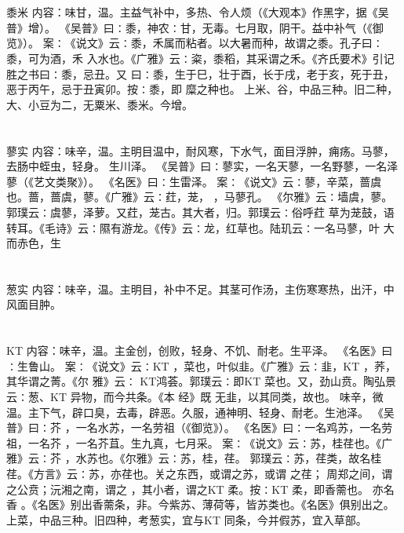 \documentclass[12pt,UTF8]{ctexbook}
\begin{document}
\chapter{}黍米
内容：味甘，温。主益气补中，多热、令人烦（《大观本》作黑字，据《吴普》增）。 
《吴普》曰∶黍，神农∶甘，无毒。七月取，阴干。益中补气（《御览》）。 
案∶《说文》云∶黍，禾属而粘者。以大暑而种，故谓之黍。孔子曰∶黍，可为酒，禾 
入水也。《广雅》云∶粢，黍稻，其采谓之禾。《齐氏要术》引记胜之书曰∶黍，忌丑。又 
曰∶黍，生于巳，壮于酉，长于戌，老于亥，死于丑，恶于丙午，忌于丑寅卯。按∶黍，即 
糜之种也。 
上米、谷，中品三种。旧二种，大、小豆为二，无粟米、黍米。今增。 


\chapter{}蓼实
内容：味辛，温。主明目温中，耐风寒，下水气，面目浮肿，痈疡。马蓼，去肠中蛭虫，轻身。 
生川泽。 
《吴普》曰∶蓼实，一名天蓼，一名野蓼，一名泽蓼（《艺文类聚》）。 
《名医》曰∶生雷泽。 
案∶《说文》云∶蓼，辛菜，蔷虞也。蔷，蔷虞，蓼。《广雅》云∶荭，茏， ，马蓼孔。 
《尔雅》云∶墙虞，蓼。郭璞云∶虞蓼，泽萝。又荭，茏古。其大者，归。郭璞云∶俗呼荭 
草为茏鼓，语转耳。《毛诗》云∶隰有游龙。《传》云∶龙，红草也。陆玑云∶一名马蓼，叶 
大而赤色，生 


\chapter{}葱实
内容：味辛，温。主明目，补中不足。其茎可作汤，主伤寒寒热，出汗，中风面目肿。 


\chapter{}KT
内容：味辛，温。主金创，创败，轻身、不饥、耐老。生平泽。 
《名医》曰∶生鲁山。 
案∶《说文》云∶KT ，菜也，叶似韭。《广雅》云∶韭，KT ，荞，其华谓之菁。《尔 
雅》云∶ 
KT鸿荟。郭璞云∶即KT 菜也。又，劲山贲。陶弘景云∶葱、KT 异物，而今共条。《本 
经》既 
无韭，以其同类，故也。 
味辛，微温。主下气，辟口臭，去毒，辟恶。久服，通神明、轻身、耐老。生池泽。 
《吴普》曰∶芥 ，一名水苏，一名劳祖（《御览》）。 
《名医》曰∶一名鸡苏，一名劳祖，一名芥 ，一名芥苴。生九真，七月采。 
案∶《说文》云∶苏，桂荏也。《广雅》云∶芥 ，水苏也。《尔雅》云∶苏，桂，荏。 
郭璞云∶苏，荏类，故名桂荏。《方言》云∶苏，亦荏也。关之东西，或谓之苏，或谓 
之荏； 
周郑之间，谓之公贲；沅湘之南，谓之 ，其小者，谓之KT 柔。按∶KT 柔，即香薷也。 
亦名香 。《名医》别出香薷条，非。今紫苏、薄荷等，皆苏类也。《名医》俱别出之。 
上菜，中品三种。旧四种，考葱实，宜与KT 同条，今并假苏，宜入草部。 
\end{document}
